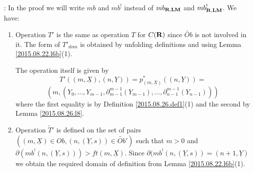 \documentclass[11pt]{article}
\newenvironment{proof}{{\bf Proof}:}{\vskip 5mm }
\newcommand{\rr}{{\bf R}}
\newcommand{\lm}{{\bf LM}}
\newcommand{\uu}{\underline}
\newcommand{\wt}{\widetilde}
\begin{document}
%
\begin{proof}
In the proof we will write $mb$ and $mb^!$ instead of $mb_{\rr,\lm}$ and $mb^!_{\rr,\lm}$. We have:
%
\begin{enumerate}
%
\item Operation $T'$ is the same as operation $T$ for $C(\rr)$ since $\wt{Ob}$ is not involved in it. The form of $T'_{dom}$ is obtained by unfolding definitions and 
using Lemma \ref{2015.08.22.l6b}(1). 

The operation itself is given by 
%
$$T'((m,\uu{X}),(n,\uu{Y}))=p_{(m,\uu{X})}^*((n,\uu{Y}))=$$
$$(m,(Y_0,\dots,Y_{m-1},\partial_{m-1}^{m-1}(Y_{m-1}),\dots, \partial_{n-1}^{m-1}(Y_{n-1})))$$
%
where the first equality is by Definition \ref{2015.08.26.def1}(1) and the second by Lemma \ref{2015.08.26.l8}. 
%
\item Operation $\wt{T}'$ is defined on the set of pairs $((m,\uu{X})\in Ob, (n,(\uu{Y},s))\in \wt{Ob}')$ such that $m>0$ and $\partial(mb^!(n,(\uu{Y},s)))>ft(m,\uu{X})$. Since $\partial(mb^!(n,(\uu{Y},s))=(n+1,\uu{Y})$ we obtain the required domain of definition from Lemma \ref{2015.08.22.l6b}(1). 


\end{enumerate}
\end{proof}
\end{document}
